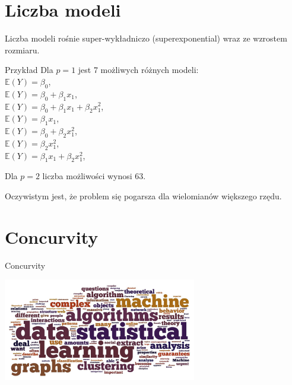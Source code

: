 \documentclass[a4paper]{beamer}
\begin{document}
\section{Liczba modeli}
\begin{frame}
\begin{block}{}
Liczba modeli rośnie super-wykładniczo (superexponential) wraz ze wzrostem rozmiaru.
\end{block}
\begin{block}{Przykład}
Dla $p=1$ jest 7 możliwych różnych modeli: \\
$\mathbb{E}(Y) = \beta_0$, \\
$\mathbb{E}(Y) = \beta_0 + \beta_1 x_1$, \\
$\mathbb{E}(Y) = \beta_0 + \beta_1 x_1 + \beta_2 x_1^2$, \\[0.3cm]


$\mathbb{E}(Y) = \beta_1 x_1$, \\
$\mathbb{E}(Y) = \beta_0 + \beta_2 x_1^2$, \\[0.3cm]


$\mathbb{E}(Y) = \beta_2 x_1^2$, \\
$\mathbb{E}(Y) = \beta_1 x_1 + \beta_2 x_1^2$, \\

\end{block}
\begin{block}{}
Dla $p=2$ liczba możliwości wynosi 63.
\end{block}
\begin{block}{}
Oczywistym jest, że problem się pogarsza dla wielomianów większego rzędu.
\end{block}
\end{frame}

\section{Concurvity}
\begin{frame}
\begin{block}{}
Concurvity
\end{block}
\begin{center}
\includegraphics[height=4.5cm]{ml-wordle.png}
\end{center}
\end{frame}
\end{document}

